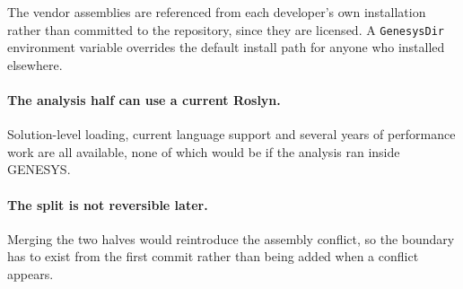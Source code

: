 The vendor assemblies are referenced from each developer's own installation
rather than committed to the repository, since they are licensed. A
\texttt{GenesysDir} environment variable overrides the default install path for
anyone who installed elsewhere.

\paragraph{The analysis half can use a current Roslyn.}
Solution-level loading, current language support and several years of performance
work are all available, none of which would be if the analysis ran inside
GENESYS.

\paragraph{The split is not reversible later.}
Merging the two halves would reintroduce the assembly conflict, so the boundary
has to exist from the first commit rather than being added when a conflict
appears.
